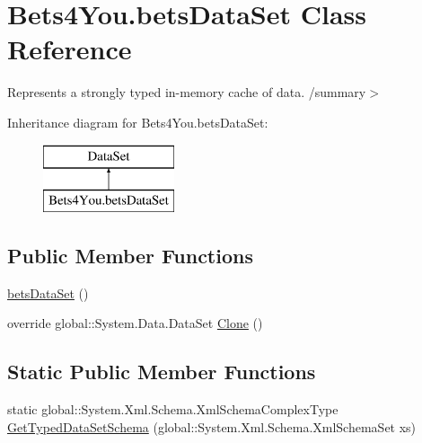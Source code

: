 \hypertarget{class_bets4_you_1_1bets_data_set}{}\section{Bets4\+You.\+bets\+Data\+Set Class Reference}
\label{class_bets4_you_1_1bets_data_set}


Represents a strongly typed in-\/memory cache of data. /summary$>$  


Inheritance diagram for Bets4\+You.\+bets\+Data\+Set\+:\begin{figure}[H]
\begin{center}
\leavevmode
\includegraphics[height=2.000000cm]{class_bets4_you_1_1bets_data_set}
\end{center}
\end{figure}
\subsection*{Public Member Functions}
\begin{DoxyCompactItemize}
\item 
\mbox{\hyperlink{class_bets4_you_1_1bets_data_set_ad5f55a672f35742a4340b72f993e0697}{bets\+Data\+Set}} ()
\item 
override global\+::\+System.\+Data.\+Data\+Set \mbox{\hyperlink{class_bets4_you_1_1bets_data_set_a11a851cbfdb2cbf028ed20f83f71d8f0}{Clone}} ()
\end{DoxyCompactItemize}
\subsection*{Static Public Member Functions}
\begin{DoxyCompactItemize}
\item 
static global\+::\+System.\+Xml.\+Schema.\+Xml\+Schema\+Complex\+Type \mbox{\hyperlink{class_bets4_you_1_1bets_data_set_a9a81227ed6b6258ae9c076d9fdb25077}{Get\+Typed\+Data\+Set\+Schema}} (global\+::\+System.\+Xml.\+Schema.\+Xml\+Schema\+Set xs)
\end{DoxyCompactItemize}
